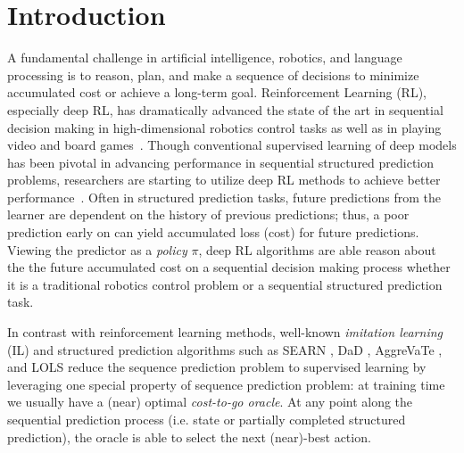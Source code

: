\documentclass{article}
\begin{document}



\section{Introduction}
A fundamental challenge in artificial intelligence, robotics, and language processing is to reason, plan, and make a sequence of decisions to minimize accumulated cost or achieve a long-term goal. Reinforcement Learning (RL), especially deep RL, has dramatically advanced the state of the art in sequential decision making in high-dimensional robotics control tasks as well as in playing video and board games~\cite{schulman2015trust,silver2016mastering}. Though conventional supervised learning of deep models has been pivotal in advancing performance in sequential structured prediction problems, researchers are starting to utilize deep RL methods to achieve better performance~\cite{ranzato2015sequence,bahdanau2016actor,li2016deep}. Often in structured prediction tasks, future predictions from the learner are dependent on the history of previous predictions; thus, a poor prediction early on can yield accumulated loss (cost) for future predictions. Viewing the predictor as a \emph{policy} $\pi$, deep RL algorithms are able reason about the the future accumulated cost on a sequential decision making process whether it is a traditional robotics control problem or a sequential structured prediction task.

In contrast with reinforcement learning methods, well-known \emph{imitation learning} (IL) and structured prediction algorithms such as SEARN \cite{daume2009search}, DaD \cite{venkatraman2015improving}, AggreVaTe \cite{ross2014reinforcement}, and LOLS \cite{chang2015learning} reduce the sequence prediction problem to supervised learning by leveraging one special property of sequence prediction problem: at training time we usually have a (near) optimal \emph{cost-to-go oracle}. At any point along the sequential prediction process (i.e. state or partially completed structured prediction), the oracle is able to select the next (near)-best action. 
\end{document}
